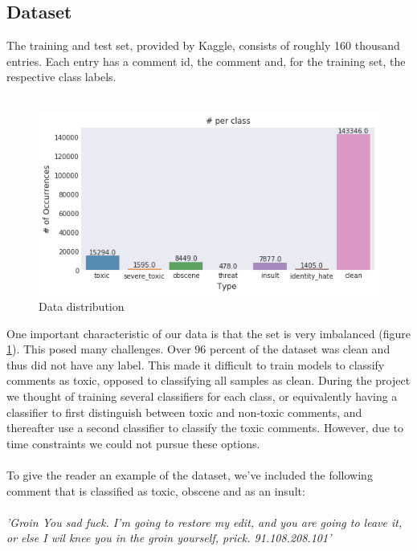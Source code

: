 \documentclass[10pt, a4paper]{article}
\begin{document}
\begin{multicols}{2}
		\section{Dataset}
		The training and test set, provided by Kaggle, consists of roughly 160 thousand entries. Each entry has a comment id, the comment and, for the training set, the respective class labels.
		\\
		\\
		\begin{figure}[H]
            \centering
            \includegraphics[scale=.4]{img/distribution_histogram.png}
            \caption{Data distribution}
            \label{fig:data_dist}
        \end{figure}
        One important characteristic of our data is that the set is very imbalanced (figure \ref{fig:data_dist}). This posed many challenges. Over 96 percent of the dataset was clean and thus did not have any label. This made it difficult to train models to classify comments as toxic, opposed to classifying all samples as clean. During the project we thought of training several classifiers for each class, or equivalently having a classifier to first distinguish between toxic and non-toxic comments, and thereafter use a second classifier to classify the toxic comments. However, due to time constraints we could not pursue these options.
	    \\
	    \\
	    To give the reader an example of the dataset, we've included the following comment that is classified as toxic, obscene and as an insult:
	    \\
	    \\
        \textit{'Groin You sad fuck. I'm going to restore my edit, and you are going to leave it, or else I wil knee you in the groin yourself, prick. 91.108.208.101'}
	

\end{multicols}
\end{document}
